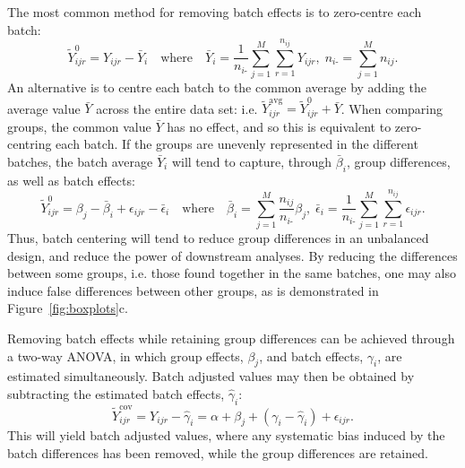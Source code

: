\documentclass[oupdraft]{bio}
\begin{document}
The most common method for removing batch effects is to zero-centre each batch:
\begin{equation}
\tilde{Y}^0_{ijr}=Y_{ijr}-\bar{Y}_{i}
\quad\text{where}\quad
\bar{Y}_i=\frac{1}{n_{i\textrm{-}}} \sum_{j=1}^M\sum_{r=1}^{n_{ij}} Y_{ijr},\;
n_{i\textrm{-}}=\sum_{j=1}^M n_{ij}.
\end{equation}
An alternative is to centre each batch to the common average by adding the average value $\bar{Y}$ across the entire data set: i.e. $\tilde{Y}^{\textrm{avg}}_{ijr}=\tilde{Y}^0_{ijr}+\bar{Y}$. When comparing groups, the common value $\bar{Y}$ has no effect, and so this is equivalent to zero-centring each batch. If the groups are unevenly represented in the different batches, the batch average $\bar{Y}_i$ will tend to capture, through $\bar\beta_i$, group differences, as well as batch effects:
\begin{equation}
\tilde{Y}^0_{ijr}=\beta_j-\bar{\beta}_i+\epsilon_{ijr}-\bar{\epsilon}_i
\quad\text{where}\quad
\bar{\beta}_i={\sum_{j=1}^M \frac{n_{ij}}{n_{i\textrm{-}}}\beta_j},\;
\bar{\epsilon}_i=\frac{1}{n_{i\textrm{-}}} \sum_{j=1}^M\sum_{r=1}^{n_{ij}} \epsilon_{ijr}.
\end{equation}
Thus, batch centering will tend to reduce group differences in an unbalanced design, and reduce the power of downstream analyses. By reducing the differences between some groups, i.e. those found together in the same batches, one may also induce false differences between other groups, as is demonstrated in Figure~\ref{fig:boxplots}c.

Removing batch effects while retaining group differences can be achieved through a two-way ANOVA, in which group effects, $\beta_j$, and batch effects, $\gamma_i$, are estimated simultaneously. Batch adjusted values may then be obtained by subtracting the estimated batch effects, $\hat\gamma_i$:
\begin{equation}
\tilde{Y}^{\textrm{cov}}_{ijr}=Y_{ijr}-\hat\gamma_i=\alpha+\beta_j+(\gamma_i-\hat\gamma_i)+\epsilon_{ijr}.
\end{equation}
This will yield batch adjusted values, where any systematic bias induced by the batch differences has been removed, while the group differences are retained.
\end{document}
